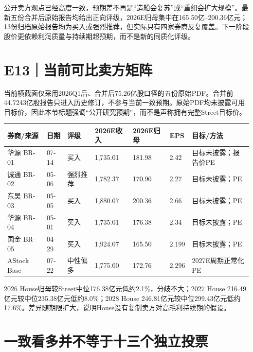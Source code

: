 公开卖方观点已经高度一致，预期差不再是“造船会复苏”或“重组会扩大规模”。最新五份合并后原始报告均给出正向评级，2026E归母集中在165.50亿--200.36亿元；13份归档原始报告均为买入或强烈推荐，但实际只有四家券商反复覆盖。下一阶段股价更依赖利润质量与持续期超预期，而不是新的同质化评级。

\section{E13｜当前可比卖方矩阵}

当前横截面仅采用2026Q1后、合并后75.26亿股口径的五份原始PDF。合并前44.7243亿股报告只进入历史修订，不参与当前一致预期。原始PDF均未披露可用目标价，因此本节标题强调“公开研究预期”，而不是声称拥有完整Street目标价。

\begin{exhibitbox}[公开券商预测对照]
\scriptsize
\begin{tabularx}{\exhibitboxwidth}{L{2.0cm}C{1.4cm}L{1.5cm}R{1.8cm}R{1.8cm}R{1.4cm}X}
\toprule
\textbf{券商/来源} & \textbf{日期} & \textbf{评级} & \textbf{2026E收入} & \textbf{2026E归母} & \textbf{EPS} & \textbf{目标/方法} \\
\midrule
华源 BR-01 & 07-14 & 买入 & 1,735.01 & 181.98 & 2.42 & 目标未披露；报告价PE \\
诚通 BR-02 & 05-06 & 强烈推荐 & 1,782.37 & 170.90 & 2.27 & 目标未披露；PE \\
东吴 BR-03 & 05-05 & 买入 & 1,880.07 & 200.36 & 2.66 & 目标未披露；PE \\
华源 BR-04 & 05-01 & 买入 & 1,735.01 & 176.38 & 2.34 & 目标未披露；PE \\
国金 BR-05 & 04-29 & 买入 & 1,924.07 & 165.50 & 2.199 & 目标未披露；PE \\
 AStock Base & 07-22 & 中性偏多 & 1,775.00 & 172.76 & 2.296 & 2027E周期正常化PE \\
\bottomrule
\end{tabularx}
\end{exhibitbox}

2026 House归母较Street中位176.38亿元低约2.1\%，分歧不大；2027 House 216.49亿元较中位235.38亿元低约8.0\%；2028 House 246.81亿元较中位299.43亿元低约17.6\%。差异随期限扩大，说明House没有复制卖方对高毛利持续期的假设。

\section{一致看多并不等于十三个独立投票}

